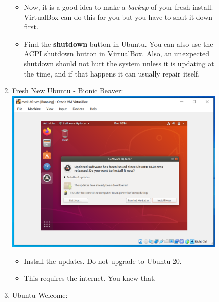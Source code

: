 \documentclass[12pt]{article}
\begin{document}
\begin{description}
\begin{description}
\begin{enumerate}
      		 \begin{itemize}
      		\item Now, it is a good idea to make a {\it backup} of your fresh install. VirtualBox can do this for you but you have to shut it down first.  
         
     		\item Find the {\bf shutdown} button in Ubuntu. You can also use the ACPI shutdown button in VirtualBox. Also, an unexpected shutdown should not hurt the system unless it is updating at the time, and if that happens it can usually repair itself. 
    		\end{itemize}
    		
    		\newpage
    		\item Fresh New Ubuntu - Bionic Beaver: \vspace{5mm} \\
      		\includegraphics[scale=.55]{Capture25.png}
      		 \begin{itemize}
        	\item Install the updates. Do not upgrade to Ubuntu 20.
        	\item This requires the internet. You knew that. 
    		\end{itemize} 
    		 \vspace{5mm} 
    		\item Ubuntu Welcome: \vspace{5mm} \\

\end{enumerate}
\end{description}
\end{description}
\end{document}
